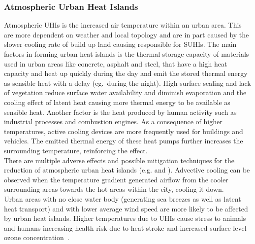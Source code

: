 \documentclass[12pt,a4paper, english]{article}
\begin{document}
\subsubsection{Atmospheric Urban Heat Islands}\label{sec:at_uhi}
Atmospheric \glspl{UHI} is the increased air temperature within an urban area. 
This are more dependent on weather and local topology and are in part caused by the slower cooling rate of build up land causing responsible for \glspl{SUHI}.
The main factors in forming urban heat islands is the thermal storage capacity of materials used in urban areas like concrete, asphalt and steel, that have a high heat capacity and heat up quickly during the day and emit the stored thermal energy as sensible heat with a delay (eg.~during the night)\cite{Ramamurthy2014}. 
High surface sealing and lack of vegetation reduce surface water availability and diminish evaporation and the cooling effect of latent heat causing more thermal energy to be available as sensible heat. %
Another factor is the heat produced by human activity such as industrial processes and combustion engines.
As a consequence of higher temperatures, active cooling devices are more frequently used for buildings and vehicles. 
The emitted thermal energy of these heat pumps further increases the surrounding temperature, reinforcing the effect.
\\
There are multiple adverse effects and possible mitigation techniques for the reduction of atmospheric urban heat islands (e.g. \cite{Nichol1994} and \cite{Stewart2011}). %
Advective cooling can be observed when the temperature gradient generated airflow from the cooler surrounding areas towards the hot areas within the city, cooling it down\cite{HaegerEugensson1999}. \\
Urban areas with no close water body (generating sea breezes as well as latent heat transport) and with lower average wind speed are more likely to be affected by urban heat islands\cite{Ramamurthy2017}. 
Higher temperatures due to \glspl{UHI} cause stress to animals and humans increasing health risk due to heat stroke and increased surface level ozone concentration~\cite{Santamouris2020}.
%
\newpage
\end{document}
